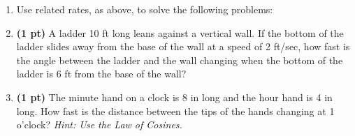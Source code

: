 \documentclass[12pt]{article}
\begin{document}
\begin{enumerate}
\vspace{1pc}
\item[] \hspace{-16pt}Use related rates, as above, to solve the following problems:
\item {\bf (1 pt)} %
A ladder 10 ft long leans against a vertical wall.  If the bottom of the ladder slides away from the base of the wall at a speed of 2 ft/sec, how fast is the angle between the ladder and the wall changing when the bottom of the ladder is 6 ft from the base of the wall?
	
\item {\bf (1 pt)} %
 The minute hand on a clock is 8 in long and the hour hand is 4 in long.  How fast is the distance between the tips of the hands changing at 1 o'clock?  \textit{Hint: Use the Law of Cosines.}

\end{enumerate}
\end{document}
